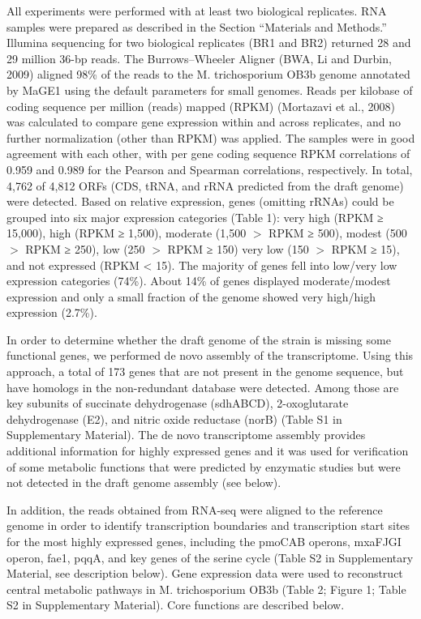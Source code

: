 All experiments were performed with at least two biological replicates.
RNA samples were prepared as described in the Section “Materials and Methods.”
Illumina sequencing for two biological replicates (BR1 and BR2) returned 28 and 29 million 36-bp reads.
The Burrows–Wheeler Aligner (BWA, Li and Durbin, 2009) aligned 98\% of the reads to the M. trichosporium OB3b genome annotated by MaGE1 using the default parameters for small genomes.
Reads per kilobase of coding sequence per million (reads) mapped (RPKM) (Mortazavi et al., 2008) was calculated to compare gene expression within and across replicates, and no further normalization (other than RPKM) was applied.
The samples were in good agreement with each other, with per gene coding sequence RPKM correlations of 0.959 and 0.989 for the Pearson and Spearman correlations, respectively.
In total, 4,762 of 4,812 ORFs (CDS, tRNA, and rRNA predicted from the draft genome) were detected.
Based on relative expression, genes (omitting rRNAs) could be grouped into six major expression categories (Table 1): very high (RPKM ≥ 15,000), high (RPKM ≥ 1,500), moderate (1,500 $>$ RPKM ≥ 500), modest (500 $>$ RPKM ≥ 250), low (250 $>$ RPKM ≥ 150) very low (150 $>$ RPKM ≥ 15), and not expressed (RPKM < 15).
The majority of genes fell into low/very low expression categories (74\%).
About 14\% of genes displayed moderate/modest expression and only a small fraction of the genome showed very high/high expression (2.7\%).


In order to determine whether the draft genome of the strain is missing some functional genes, we performed de novo assembly of the transcriptome.
Using this approach, a total of 173 genes that are not present in the genome sequence, but have homologs in the non-redundant database were detected.
Among those are key subunits of succinate dehydrogenase (sdhABCD), 2-oxoglutarate dehydrogenase (E2), and nitric oxide reductase (norB) (Table S1 in Supplementary Material).
The de novo transcriptome assembly provides additional information for highly expressed genes and it was used for verification of some metabolic functions that were predicted by enzymatic studies but were not detected in the draft genome assembly (see below).

In addition, the reads obtained from RNA-seq were aligned to the reference genome in order to identify transcription boundaries and transcription start sites for the most highly expressed genes, including the pmoCAB operons, mxaFJGI operon, fae1, pqqA, and key genes of the serine cycle (Table S2 in Supplementary Material, see description below).
Gene expression data were used to reconstruct central metabolic pathways in M. trichosporium OB3b (Table 2; Figure 1; Table S2 in Supplementary Material).
Core functions are described below.

